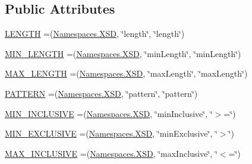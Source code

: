 \subsection*{Public Attributes}
\begin{DoxyCompactItemize}
\item 
\hyperlink{enumorg_1_1semanticweb_1_1owlapi_1_1vocab_1_1_o_w_l_facet_a94848a88879ba59175ec96c477ca9ae2}{L\-E\-N\-G\-T\-H} =(\hyperlink{enumorg_1_1semanticweb_1_1owlapi_1_1vocab_1_1_namespaces_ad23159b4298d8448c5af25510c8c7f13}{Namespaces.\-X\-S\-D}, \char`\"{}length\char`\"{}, \char`\"{}length\char`\"{})
\item 
\hyperlink{enumorg_1_1semanticweb_1_1owlapi_1_1vocab_1_1_o_w_l_facet_a0d37b804e1a6f850d8de9d90b24659da}{M\-I\-N\-\_\-\-L\-E\-N\-G\-T\-H} =(\hyperlink{enumorg_1_1semanticweb_1_1owlapi_1_1vocab_1_1_namespaces_ad23159b4298d8448c5af25510c8c7f13}{Namespaces.\-X\-S\-D}, \char`\"{}min\-Length\char`\"{}, \char`\"{}min\-Length\char`\"{})
\item 
\hyperlink{enumorg_1_1semanticweb_1_1owlapi_1_1vocab_1_1_o_w_l_facet_ad14fff0cda2f326a486b922076016d19}{M\-A\-X\-\_\-\-L\-E\-N\-G\-T\-H} =(\hyperlink{enumorg_1_1semanticweb_1_1owlapi_1_1vocab_1_1_namespaces_ad23159b4298d8448c5af25510c8c7f13}{Namespaces.\-X\-S\-D}, \char`\"{}max\-Length\char`\"{}, \char`\"{}max\-Length\char`\"{})
\item 
\hyperlink{enumorg_1_1semanticweb_1_1owlapi_1_1vocab_1_1_o_w_l_facet_aac44b7eb7db8e6f75fccbfea32296169}{P\-A\-T\-T\-E\-R\-N} =(\hyperlink{enumorg_1_1semanticweb_1_1owlapi_1_1vocab_1_1_namespaces_ad23159b4298d8448c5af25510c8c7f13}{Namespaces.\-X\-S\-D}, \char`\"{}pattern\char`\"{}, \char`\"{}pattern\char`\"{})
\item 
\hyperlink{enumorg_1_1semanticweb_1_1owlapi_1_1vocab_1_1_o_w_l_facet_a9b06a40dbc87570dc62c32877342388c}{M\-I\-N\-\_\-\-I\-N\-C\-L\-U\-S\-I\-V\-E} =(\hyperlink{enumorg_1_1semanticweb_1_1owlapi_1_1vocab_1_1_namespaces_ad23159b4298d8448c5af25510c8c7f13}{Namespaces.\-X\-S\-D}, \char`\"{}min\-Inclusive\char`\"{}, \char`\"{}$>$=\char`\"{})
\item 
\hyperlink{enumorg_1_1semanticweb_1_1owlapi_1_1vocab_1_1_o_w_l_facet_a27c52fbbfdcc423521b725bc8a2dc949}{M\-I\-N\-\_\-\-E\-X\-C\-L\-U\-S\-I\-V\-E} =(\hyperlink{enumorg_1_1semanticweb_1_1owlapi_1_1vocab_1_1_namespaces_ad23159b4298d8448c5af25510c8c7f13}{Namespaces.\-X\-S\-D}, \char`\"{}min\-Exclusive\char`\"{}, \char`\"{}$>$\char`\"{})
\item 
\hyperlink{enumorg_1_1semanticweb_1_1owlapi_1_1vocab_1_1_o_w_l_facet_ac9a64ef90c0effd4c743c76c93dc7a6f}{M\-A\-X\-\_\-\-I\-N\-C\-L\-U\-S\-I\-V\-E} =(\hyperlink{enumorg_1_1semanticweb_1_1owlapi_1_1vocab_1_1_namespaces_ad23159b4298d8448c5af25510c8c7f13}{Namespaces.\-X\-S\-D}, \char`\"{}max\-Inclusive\char`\"{}, \char`\"{}$<$=\char`\"{})

\end{DoxyCompactItemize}
